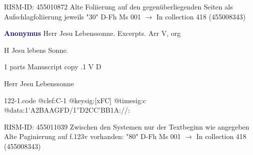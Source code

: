 \documentclass[twocolumn]{book}
\begin{document}
\newline RISM-ID: 455010872
\newline Alte Foliierung auf den gegenüberliegenden Seiten als Aufschlagfoliierung jeweils "30"
\newline D-Fh  Ms 001
\newline $\rightarrow$ In collection 418 (455008343)

\newline \par \vspace{7pt} \textcolor{darkblue}{\textbf{Anonymus  }}
\newline Herr Jesu Lebenssonne. Excerpts. Arr    
\newline V, org
\newline \begin{itshape} H Jesu lebens Sonne.\end{itshape} 
\newline \textcolor{darkblue}{}  1 parts  
\newline Manuscript copy
.1  V  D
\newline \begin{footnotesize} Herr Jesu Lebenssonne \end{footnotesize}  
\begin{filecontents*}{122-1.code}
@clef:C-1
@keysig:[xFC]
@timesig:c
@data:1'A2BAAGFD/1''D2CC'BB1A://:
\end{filecontents*}
\newline
%

\newline RISM-ID: 455011039
\newline Zwischen den Systemen nur der Textbeginn wie angegeben
\newline Alte Paginierung auf f.123v vorhanden: "80"
\newline D-Fh  Ms 001
\newline $\rightarrow$ In collection 418 (455008343)
\end{document}
